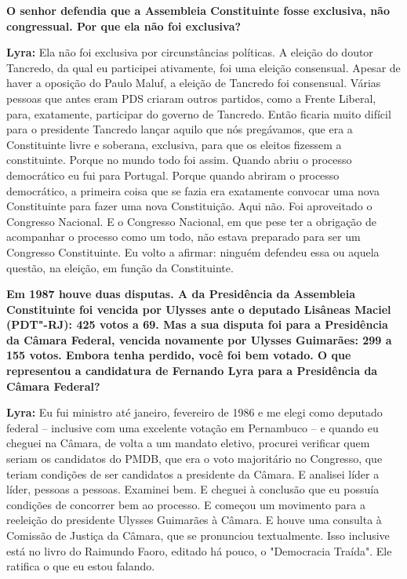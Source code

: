 \textbf{O senhor defendia que a Assembleia Constituinte fosse exclusiva,
não congressual. Por que ela não foi exclusiva?}

\textbf{Lyra:} Ela não foi exclusiva por circunstâncias políticas. A
eleição do doutor Tancredo, da qual eu participei ativamente, foi uma
eleição consensual. Apesar de haver a oposição do Paulo Maluf, a eleição
de Tancredo foi consensual. Várias pessoas que antes eram PDS criaram
outros partidos, como a Frente Liberal, para, exatamente, participar do
governo de Tancredo. Então ficaria muito difícil para o presidente
Tancredo lançar aquilo que nós pregávamos, que era a Constituinte livre
e soberana, exclusiva, para que os eleitos fizessem a constituinte.
Porque no mundo todo foi assim. Quando abriu o processo democrático eu
fui para Portugal. Porque quando abriram o processo democrático, a
primeira coisa que se fazia era exatamente convocar uma nova
Constituinte para fazer uma nova Constituição. Aqui não. Foi aproveitado
o Congresso Nacional. E o Congresso Nacional, em que pese ter a
obrigação de acompanhar o processo como um todo, não estava preparado
para ser um Congresso Constituinte. Eu volto a afirmar: ninguém defendeu
essa ou aquela questão, na eleição, em função da Constituinte.

\textbf{Em 1987 houve duas disputas. A da Presidência da Assembleia
Constituinte foi vencida por Ulysses ante o deputado Lisâneas Maciel
(PDT"-RJ): 425 votos a 69. Mas a sua disputa foi para a Presidência da
Câmara Federal, vencida novamente por Ulysses Guimarães: 299 a 155
votos. Embora tenha perdido, você foi bem votado. O que representou a
candidatura de Fernando Lyra para a Presidência da Câmara Federal?}

\textbf{Lyra:} Eu fui ministro até janeiro, fevereiro de 1986 e me elegi
como deputado federal -- inclusive com uma excelente votação em
Pernambuco -- e quando eu cheguei na Câmara, de volta a um mandato
eletivo, procurei verificar quem seriam os candidatos do PMDB, que era o
voto majoritário no Congresso, que teriam condições de ser candidatos a
presidente da Câmara. E analisei líder a líder, pessoas a pessoas.
Examinei bem. E cheguei à conclusão que eu possuía condições de
concorrer bem ao processo. E começou um movimento para a reeleição do
presidente Ulysses Guimarães à Câmara. E houve uma consulta à Comissão
de Justiça da Câmara, que se pronunciou textualmente. Isso inclusive
está no livro do Raimundo Faoro, editado há pouco, o "Democracia
Traída". Ele ratifica o que eu estou falando.

